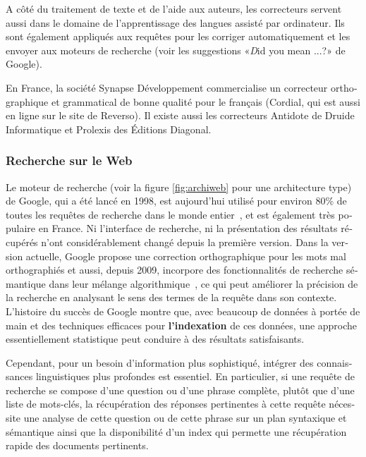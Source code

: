 \begin{french}
\begin{multicols}{2}
A côté du traitement de texte et de l'aide aux auteurs, les
correcteurs servent aussi dans le domaine de l'apprentissage des
langues assisté par ordinateur. Ils sont également appliqués aux
requêtes pour les corriger automatiquement et les envoyer aux moteurs
de recherche (voir les suggestions «{\textit Did you mean ...?}» de
Google).

En France, la société Synapse Développement commercialise un
correcteur orthographique et grammatical de bonne qualité pour le
français (Cordial, qui est aussi en ligne sur le site de Reverso). Il
existe aussi les correcteurs Antidote de Druide Informatique et
Prolexis des Éditions Diagonal.

\subsubsection{Recherche sur le Web}
Le moteur de recherche (voir la figure \ref{fig:archiweb} pour une
architecture type) de Google, qui a été lancé en 1998, est aujourd'hui 
utilisé pour environ 80\% de toutes les requêtes de recherche
dans le monde entier~\cite{googleworld}, et est également très
populaire en France. Ni l'interface de recherche, ni la présentation
des résultats récupérés n'ont considérablement changé depuis la
première version. Dans la version actuelle, Google propose une
correction orthographique pour les mots mal orthographiés et aussi,
depuis 2009, incorpore des fonctionnalités de recherche sémantique
dans leur mélange algorithmique~\cite{googlesemantics}, ce qui peut
améliorer la précision de la recherche en analysant le sens des termes
de la requête dans son contexte. L'histoire du succès de Google montre
que, avec beaucoup de données à portée de main et des techniques
efficaces pour {\bf l'indexation} de ces données, une approche
essentiellement statistique peut conduire à des résultats
satisfaisants.

Cependant, pour un besoin d'information plus sophistiqué, intégrer des
connaissances linguistiques plus profondes est essentiel. En
particulier, si une requête de recherche se compose d'une question ou
d'une phrase complète, plutôt que d'une liste de mots-clés, la
récupération des réponses pertinentes à cette requête nécessite une
analyse de cette question ou de cette phrase sur un plan syntaxique et
sémantique ainsi que la disponibilité d'un index qui permette une
récupération rapide des documents pertinents.


\end{multicols}
\end{french}
